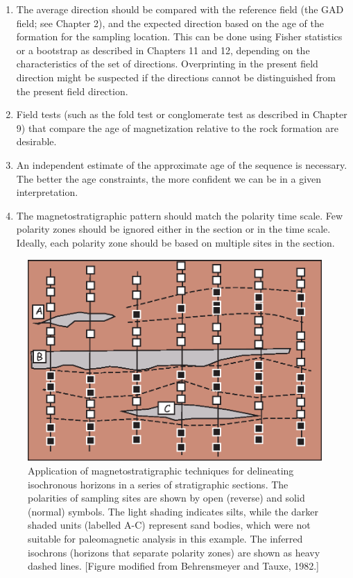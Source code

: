 \begin{enumerate}
\item The average direction should be compared with the reference field
(the GAD field; see Chapter 2), and the expected direction based on the age 
of the formation for the
sampling location.  This can be done using  Fisher statistics or a bootstrap as described in Chapters 11 and 12, depending on the characteristics of the set of  directions.  Overprinting in the present field direction might be suspected if the directions cannot be distinguished from the present field direction.

\item  Field tests (such as the fold test or conglomerate test as
described in Chapter 9) that compare the age of magnetization relative to the
rock formation are desirable.

\item An independent estimate of the approximate age of the sequence is
necessary.  The better the age constraints, 
the more confident we can be in a given interpretation.

\item The magnetostratigraphic pattern should match the polarity time scale.
 Few polarity zones should be ignored either in the
section or in the time scale.  Ideally, each polarity zone should be
based on multiple sites in the section. 
\end{enumerate}


\begin{figure}[htb]
\centering  \includegraphics[width=11.5 cm]{EPSfiles/isochron.eps}
\caption{Application of magnetostratigraphic techniques for delineating
isochronous horizons in a series of stratigraphic sections.  The
polarities of sampling sites are shown by open (reverse) and solid
(normal) symbols.  The light shading indicates   silts, while the
darker shaded units (labelled A-C)  represent sand bodies, 
which were not suitable for paleomagnetic analysis in this example. 
The inferred isochrons (horizons that separate 
polarity zones) are shown as heavy dashed lines. [Figure modified from Behrensmeyer and Tauxe, 1982.]}
\label{fig:isochron}
\end{figure}


